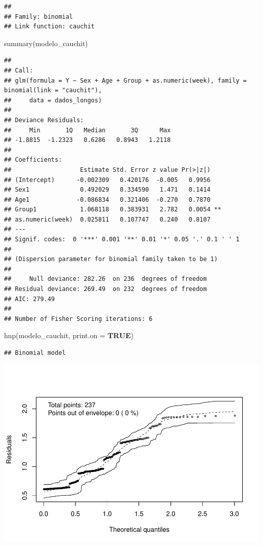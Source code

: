 \documentclass[
]{article}
\newenvironment{Shaded}{\begin{snugshade}}{\end{snugshade}}
\newcommand{\AttributeTok}[1]{\textcolor[rgb]{0.80,0.80,0.80}{#1}}
\newcommand{\ConstantTok}[1]{\textcolor[rgb]{0.86,0.64,0.64}{\textbf{#1}}}
\newcommand{\FunctionTok}[1]{\textcolor[rgb]{0.94,0.94,0.56}{#1}}
\newcommand{\NormalTok}[1]{\textcolor[rgb]{0.80,0.80,0.80}{#1}}
\begin{document}
\begin{verbatim}
## 
## Family: binomial 
## Link function: cauchit
\end{verbatim}

\begin{Shaded}
\begin{Highlighting}[]
\FunctionTok{summary}\NormalTok{(modelo\_cauchit)}
\end{Highlighting}
\end{Shaded}

\begin{verbatim}
## 
## Call:
## glm(formula = Y ~ Sex + Age + Group + as.numeric(week), family = binomial(link = "cauchit"), 
##     data = dados_longos)
## 
## Deviance Residuals: 
##     Min       1Q   Median       3Q      Max  
## -1.8815  -1.2323   0.6286   0.8943   1.2118  
## 
## Coefficients:
##                   Estimate Std. Error z value Pr(>|z|)   
## (Intercept)      -0.002309   0.420176  -0.005   0.9956   
## Sex1              0.492029   0.334590   1.471   0.1414   
## Age1             -0.086834   0.321406  -0.270   0.7870   
## Group1            1.068118   0.383931   2.782   0.0054 **
## as.numeric(week)  0.025811   0.107747   0.240   0.8107   
## ---
## Signif. codes:  0 '***' 0.001 '**' 0.01 '*' 0.05 '.' 0.1 ' ' 1
## 
## (Dispersion parameter for binomial family taken to be 1)
## 
##     Null deviance: 282.26  on 236  degrees of freedom
## Residual deviance: 269.49  on 232  degrees of freedom
## AIC: 279.49
## 
## Number of Fisher Scoring iterations: 6
\end{verbatim}

\begin{Shaded}
\begin{Highlighting}[]
\FunctionTok{hnp}\NormalTok{(modelo\_cauchit, }\AttributeTok{print.on =} \ConstantTok{TRUE}\NormalTok{)}
\end{Highlighting}
\end{Shaded}

\begin{verbatim}
## Binomial model
\end{verbatim}

\includegraphics{EDA__files/figure-latex/unnamed-chunk-12-1.pdf}
\end{document}

